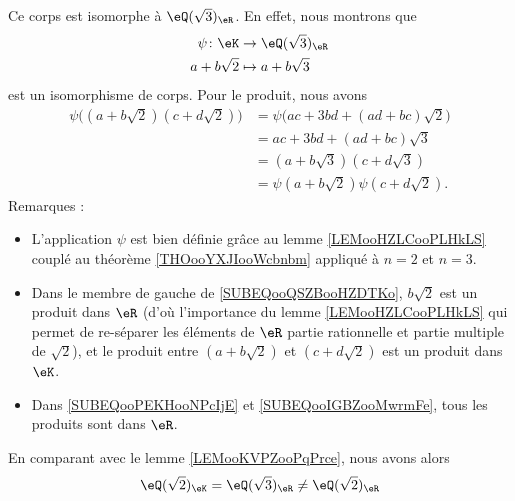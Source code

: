 \begin{example}
	Ce corps est isomorphe à \( \eQ(\sqrt{ 3 })_{\eR}\). En effet, nous montrons que
	\begin{equation}
		\begin{aligned}
			\psi\colon \eK & \to \eQ(\sqrt{ 3 })_{\eR} \\
			a+b\sqrt{ 2 }  & \mapsto a+b\sqrt{ 3 }
		\end{aligned}
	\end{equation}
	est un isomorphisme de corps. Pour le produit, nous avons
	\begin{subequations}
		\begin{align}
			\psi\big( (a+b\sqrt{ 2 })(c+d\sqrt{ 2 }) \big) & =\psi\big( ac+3bd+(ad+bc)\sqrt{ 2 } \big) \label{SUBEQooQSZBooHZDTKo} \\
			                                               & =ac+3bd+(ad+bc)\sqrt{ 3 }\label{SUBEQooPEKHooNPcIjE}                  \\
			                                               & =(a+b\sqrt{ 3 })(c+d\sqrt{ 3 })\label{SUBEQooIGBZooMwrmFe}            \\
			                                               & =\psi(a+b\sqrt{ 2 })\psi(c+d\sqrt{ 2 }).
		\end{align}
	\end{subequations}
	Remarques :
	\begin{itemize}
		\item L'application \( \psi\) est bien définie grâce au lemme \ref{LEMooHZLCooPLHkLS} couplé au théorème \ref{THOooYXJIooWcbnbm} appliqué à \( n=2\) et \( n=3\).
		\item Dans le membre de gauche de \eqref{SUBEQooQSZBooHZDTKo}, \( b\sqrt{ 2 }\) est un produit dans \( \eR\) (d'où l'importance du lemme \ref{LEMooHZLCooPLHkLS} qui permet de re-séparer les éléments de \( \eR\) partie rationnelle et partie multiple de \( \sqrt{ 2 }\)), et le produit entre \( (a+b\sqrt{ 2 })\) et \( (c+d\sqrt{ 2 })\) est un produit dans \( \eK\).
		\item
		      Dans \eqref{SUBEQooPEKHooNPcIjE} et \eqref{SUBEQooIGBZooMwrmFe}, tous les produits sont dans \( \eR\).
	\end{itemize}

	En comparant avec le lemme \ref{LEMooKVPZooPqPrce}, nous avons alors
	\begin{equation}
		\eQ(\sqrt{ 2 })_\eK=\eQ(\sqrt{ 3 })_\eR\neq \eQ(\sqrt{ 2 })_{\eR}
	\end{equation}
\end{example}

